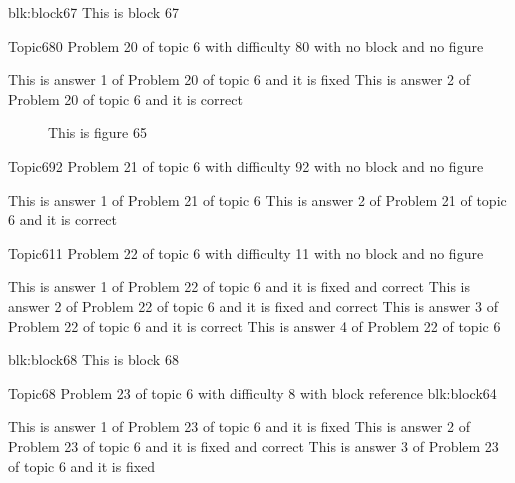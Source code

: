 \documentclass[master]{exam}
\begin{document}
\begin{block}{blk:block67}
This is block 67
\end{block}


\begin{problem}{Topic6}{80}
	Problem 20 of topic 6 with difficulty 80 with no block and no figure
	\begin{answers}
		\answer[fixed] This is answer 1 of Problem 20 of topic 6 and it is fixed
		\answer[correct] This is answer 2 of Problem 20 of topic 6 and it is correct
	\end{answers}
\end{problem}



\begin{figure}
	\begin{center}
		This is figure 65 
		\label{fig:figure65}
	\end{center}
\end{figure}

\begin{problem}{Topic6}{92}
	Problem 21 of topic 6 with difficulty 92 with no block and no figure
	\begin{answers}
		\answer This is answer 1 of Problem 21 of topic 6 
		\answer[correct] This is answer 2 of Problem 21 of topic 6 and it is correct
	\end{answers}
\end{problem}

\begin{problem}{Topic6}{11}
	Problem 22 of topic 6 with difficulty 11 with no block and no figure
	\begin{answers}
		 This is answer 1 of Problem 22 of topic 6 and it is fixed and correct
		 This is answer 2 of Problem 22 of topic 6 and it is fixed and correct
		\answer[correct] This is answer 3 of Problem 22 of topic 6 and it is correct
		\answer This is answer 4 of Problem 22 of topic 6 
	\end{answers}
\end{problem}



\begin{block}{blk:block68}
This is block 68
\end{block}


\begin{problem}[requires=blk:block64]{Topic6}{8}
	Problem 23 of topic 6 with difficulty 8 with block reference blk:block64
	\begin{answers}
		\answer[fixed] This is answer 1 of Problem 23 of topic 6 and it is fixed
		 This is answer 2 of Problem 23 of topic 6 and it is fixed and correct
		\answer[fixed] This is answer 3 of Problem 23 of topic 6 and it is fixed
	\end{answers}
\end{problem}
\end{document}

